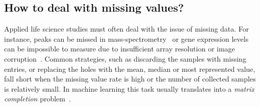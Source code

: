 \subsection{How to deal with missing values?} %
Applied life science studies must often deal with the issue of missing data. For instance, peaks can be missed in mass-spectrometry~\cite{jung2014adaption} or gene expression levels can be impossible to measure due to insufficient array resolution or image corruption~\cite{stekhoven2011missforest, troyanskaya2001missing}. Common strategies, such as discarding the samples with missing entries, or replacing the holes with the mean, median or most represented value, fall short when the missing value rate is high or the number of collected samples is relatively small. In machine learning this task usually translates into a \textit{matrix completion} problem~\cite{candes2009exact}.
